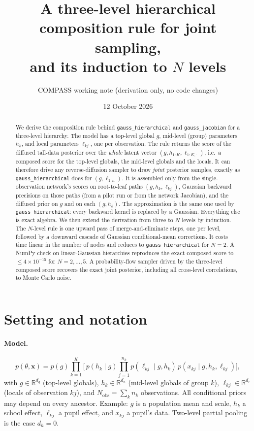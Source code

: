 \documentclass[11pt]{article}
\title{A three-level hierarchical composition rule for joint sampling,\\
and its induction to $N$ levels}
\author{COMPASS working note (derivation only, no code changes)}
\date{12 October 2026}
\theoremstyle{definition}
\theoremstyle{remark}
\newcommand{\R}{\mathbb{R}}
\newcommand{\X}{\mathbf{x}}
\newcommand{\arrowm}{\texttt{gauss\_\allowbreak hierarchical}}
\newcommand{\quiver}{\texttt{gauss\_\allowbreak jacobian}}
\newcommand{\hk}{h_k}
\newcommand{\lkj}{\ell_{kj}}
\begin{document}
\maketitle

\begin{abstract}
We derive the composition rule behind \arrowm{} and \quiver{} for a
three-level hierarchy. The model has a top-level global $g$, mid-level
(group) parameters $h_k$, and local parameters $\ell_{kj}$, one per
observation. The rule returns the score of the diffused tall-data posterior
over the \emph{whole} latent vector $(g,h_{1:K},\ell_{1:K,\cdot})$, i.e.\ a
composed score for the top-level globals, the mid-level globals and the locals.
It can therefore drive any reverse-diffusion sampler to draw \emph{joint}
posterior samples, exactly as \arrowm{} does for $(g,\ell_{1:n})$. It is
assembled only from the single-observation network's scores on root-to-leaf
paths $(g,h_k,\ell_{kj})$, Gaussian backward precisions on those paths (from a
pilot run or from the network Jacobian), and the diffused prior on $g$ and
on each $(g,h_k)$. The approximation is the same one used by \arrowm{}: every
backward kernel is replaced by a Gaussian. Everything else is exact algebra. We
then extend the derivation from three to $N$ levels by induction. The $N$-level
rule is one upward pass of merge-and-eliminate steps, one per level, followed by
a downward cascade of Gaussian conditional-mean corrections. It costs time linear
in the number of nodes and reduces to \arrowm{} for $N=2$. A NumPy check on
linear-Gaussian hierarchies reproduces the exact composed score to
$\le4\times10^{-15}$ for $N=2,\dots,5$. A probability-flow sampler driven by the
three-level composed score recovers the exact joint posterior, including all
cross-level correlations, to Monte Carlo noise.
\end{abstract}

\tableofcontents

\section{Setting and notation}\label{sec:setting}

\paragraph{Model.}
\begin{equation}\label{eq:model}
p(\theta,\X)=p(g)\prod_{k=1}^{K}\Big[\,p(\hk\mid g)\prod_{j=1}^{n_k}p(\lkj\mid g,\hk)\,p(x_{kj}\mid g,\hk,\lkj)\Big],
\end{equation}
with $g\in\R^{d_g}$ (top-level globals), $\hk\in\R^{d_h}$ (mid-level globals of
group $k$), $\lkj\in\R^{d_\ell}$ (locals of observation $kj$), and $N_\text{obs}=\sum_kn_k$
observations. All conditional priors may depend on every ancestor. Example:
$g$ is a population mean and scale, $\hk$ a school effect, $\lkj$ a pupil effect,
and $x_{kj}$ a pupil's data. Two-level partial pooling is the case $d_h=0$.
\end{document}
